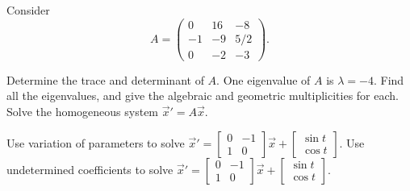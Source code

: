 \documentclass{ximera}
\begin{document}
\begin{exercise}
    Consider 
    \[
        A=
        \begin{pmatrix} 
            0& 16& -8 \\ 
            -1& -9 &5/2\\ 
            0 &-2 &-3
        \end{pmatrix}.
    \] %
    \begin{tasks}
        \task Determine the trace and determinant of $A$. 
        \task  One eigenvalue of $A$ is $\lambda=-4$. Find all the eigenvalues, and give the algebraic and geometric multiplicities for each.
        \task Solve the homogeneous system $\vec{x}'= A\vec{x}$.
    \end{tasks}
\end{exercise}

\begin{exercise}
    \begin{tasks}%
        \task Use variation of parameters to solve $\vec{x}'=\begin{bmatrix} 0&-1 \\ 1& 0\end{bmatrix}\vec{x}+ \displaystyle \begin{bmatrix} \sin t \\ \cos t \end{bmatrix}$.
        \task Use undetermined coefficients to solve $\vec{x}'=\begin{bmatrix} 0&-1 \\ 1& 0\end{bmatrix}\vec{x}+ \displaystyle \begin{bmatrix} \sin t \\ \cos t \end{bmatrix}$.
    \end{tasks}
\end{exercise}
\end{document}
